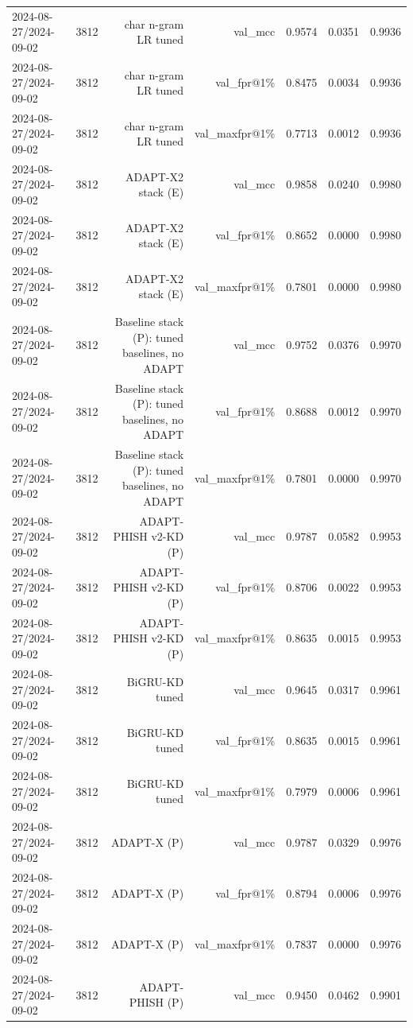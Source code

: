 \begin{table}[t]
\begin{tabular}{llrrrrr}
2024-08-27/2024-09-02 & 3812 & char n-gram LR tuned & val\_mcc & 0.9574 & 0.0351 & 0.9936 \\
2024-08-27/2024-09-02 & 3812 & char n-gram LR tuned & val\_fpr@1\% & 0.8475 & 0.0034 & 0.9936 \\
2024-08-27/2024-09-02 & 3812 & char n-gram LR tuned & val\_maxfpr@1\% & 0.7713 & 0.0012 & 0.9936 \\
2024-08-27/2024-09-02 & 3812 & ADAPT-X2 stack (E) & val\_mcc & 0.9858 & 0.0240 & 0.9980 \\
2024-08-27/2024-09-02 & 3812 & ADAPT-X2 stack (E) & val\_fpr@1\% & 0.8652 & 0.0000 & 0.9980 \\
2024-08-27/2024-09-02 & 3812 & ADAPT-X2 stack (E) & val\_maxfpr@1\% & 0.7801 & 0.0000 & 0.9980 \\
2024-08-27/2024-09-02 & 3812 & Baseline stack (P): tuned baselines, no ADAPT & val\_mcc & 0.9752 & 0.0376 & 0.9970 \\
2024-08-27/2024-09-02 & 3812 & Baseline stack (P): tuned baselines, no ADAPT & val\_fpr@1\% & 0.8688 & 0.0012 & 0.9970 \\
2024-08-27/2024-09-02 & 3812 & Baseline stack (P): tuned baselines, no ADAPT & val\_maxfpr@1\% & 0.7801 & 0.0000 & 0.9970 \\
2024-08-27/2024-09-02 & 3812 & ADAPT-PHISH v2-KD (P) & val\_mcc & 0.9787 & 0.0582 & 0.9953 \\
2024-08-27/2024-09-02 & 3812 & ADAPT-PHISH v2-KD (P) & val\_fpr@1\% & 0.8706 & 0.0022 & 0.9953 \\
2024-08-27/2024-09-02 & 3812 & ADAPT-PHISH v2-KD (P) & val\_maxfpr@1\% & 0.8635 & 0.0015 & 0.9953 \\
2024-08-27/2024-09-02 & 3812 & BiGRU-KD tuned & val\_mcc & 0.9645 & 0.0317 & 0.9961 \\
2024-08-27/2024-09-02 & 3812 & BiGRU-KD tuned & val\_fpr@1\% & 0.8635 & 0.0015 & 0.9961 \\
2024-08-27/2024-09-02 & 3812 & BiGRU-KD tuned & val\_maxfpr@1\% & 0.7979 & 0.0006 & 0.9961 \\
2024-08-27/2024-09-02 & 3812 & ADAPT-X (P) & val\_mcc & 0.9787 & 0.0329 & 0.9976 \\
2024-08-27/2024-09-02 & 3812 & ADAPT-X (P) & val\_fpr@1\% & 0.8794 & 0.0006 & 0.9976 \\
2024-08-27/2024-09-02 & 3812 & ADAPT-X (P) & val\_maxfpr@1\% & 0.7837 & 0.0000 & 0.9976 \\
2024-08-27/2024-09-02 & 3812 & ADAPT-PHISH (P) & val\_mcc & 0.9450 & 0.0462 & 0.9901 \\

\end{tabular}
\end{table}
